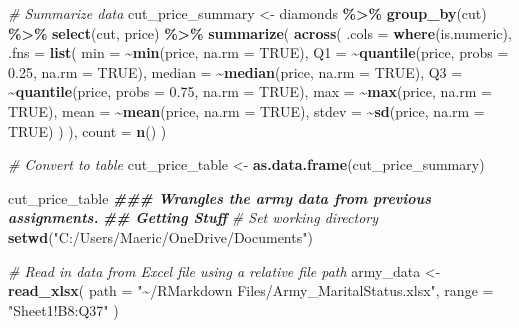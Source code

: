 \documentclass[
]{article}
\newenvironment{Shaded}{\begin{snugshade}}{\end{snugshade}}
\newcommand{\AttributeTok}[1]{\textcolor[rgb]{0.13,0.29,0.53}{#1}}
\newcommand{\CommentTok}[1]{\textcolor[rgb]{0.56,0.35,0.01}{\textit{#1}}}
\newcommand{\ConstantTok}[1]{\textcolor[rgb]{0.56,0.35,0.01}{#1}}
\newcommand{\DocumentationTok}[1]{\textcolor[rgb]{0.56,0.35,0.01}{\textbf{\textit{#1}}}}
\newcommand{\FloatTok}[1]{\textcolor[rgb]{0.00,0.00,0.81}{#1}}
\newcommand{\FunctionTok}[1]{\textcolor[rgb]{0.13,0.29,0.53}{\textbf{#1}}}
\newcommand{\NormalTok}[1]{#1}
\newcommand{\OtherTok}[1]{\textcolor[rgb]{0.56,0.35,0.01}{#1}}
\newcommand{\SpecialCharTok}[1]{\textcolor[rgb]{0.81,0.36,0.00}{\textbf{#1}}}
\newcommand{\StringTok}[1]{\textcolor[rgb]{0.31,0.60,0.02}{#1}}
\begin{document}
\begin{Shaded}
\begin{Highlighting}[]
\CommentTok{\# Summarize data}
\NormalTok{cut\_price\_summary }\OtherTok{\textless{}{-}}\NormalTok{ diamonds }\SpecialCharTok{\%\textgreater{}\%}
  \FunctionTok{group\_by}\NormalTok{(cut) }\SpecialCharTok{\%\textgreater{}\%}
  \FunctionTok{select}\NormalTok{(cut, price) }\SpecialCharTok{\%\textgreater{}\%}
  \FunctionTok{summarize}\NormalTok{(}
    \FunctionTok{across}\NormalTok{(}
      \AttributeTok{.cols =} \FunctionTok{where}\NormalTok{(is.numeric),}
      \AttributeTok{.fns =} \FunctionTok{list}\NormalTok{(}
        \AttributeTok{min =} \SpecialCharTok{\textasciitilde{}}\FunctionTok{min}\NormalTok{(price, }\AttributeTok{na.rm =} \ConstantTok{TRUE}\NormalTok{),}
        \AttributeTok{Q1 =} \SpecialCharTok{\textasciitilde{}}\FunctionTok{quantile}\NormalTok{(price, }\AttributeTok{probs =} \FloatTok{0.25}\NormalTok{, }\AttributeTok{na.rm =} \ConstantTok{TRUE}\NormalTok{),}
        \AttributeTok{median =} \SpecialCharTok{\textasciitilde{}}\FunctionTok{median}\NormalTok{(price, }\AttributeTok{na.rm =} \ConstantTok{TRUE}\NormalTok{),}
        \AttributeTok{Q3 =} \SpecialCharTok{\textasciitilde{}}\FunctionTok{quantile}\NormalTok{(price, }\AttributeTok{probs =} \FloatTok{0.75}\NormalTok{, }\AttributeTok{na.rm =} \ConstantTok{TRUE}\NormalTok{),}
        \AttributeTok{max =} \SpecialCharTok{\textasciitilde{}}\FunctionTok{max}\NormalTok{(price, }\AttributeTok{na.rm =} \ConstantTok{TRUE}\NormalTok{),}
        \AttributeTok{mean =} \SpecialCharTok{\textasciitilde{}}\FunctionTok{mean}\NormalTok{(price, }\AttributeTok{na.rm =} \ConstantTok{TRUE}\NormalTok{),}
        \AttributeTok{stdev =} \SpecialCharTok{\textasciitilde{}}\FunctionTok{sd}\NormalTok{(price, }\AttributeTok{na.rm =} \ConstantTok{TRUE}\NormalTok{)}
\NormalTok{      )}
\NormalTok{    ),}
    \AttributeTok{count =} \FunctionTok{n}\NormalTok{()}
\NormalTok{  )}

\CommentTok{\# Convert to table}
\NormalTok{cut\_price\_table }\OtherTok{\textless{}{-}} \FunctionTok{as.data.frame}\NormalTok{(cut\_price\_summary)}

\NormalTok{cut\_price\_table}
\DocumentationTok{\#\#\# Wrangles the army data from previous assignments.}
\DocumentationTok{\#\# Getting Stuff}
\CommentTok{\# Set working directory}
\FunctionTok{setwd}\NormalTok{(}\StringTok{"C:/Users/Maeric/OneDrive/Documents"}\NormalTok{)}

\CommentTok{\# Read in data from Excel file using a relative file path}
\NormalTok{army\_data }\OtherTok{\textless{}{-}} \FunctionTok{read\_xlsx}\NormalTok{(}
  \AttributeTok{path =} \StringTok{"\textasciitilde{}/RMarkdown Files/Army\_MaritalStatus.xlsx"}\NormalTok{,}
  \AttributeTok{range =} \StringTok{"Sheet1!B8:Q37"}
\NormalTok{)}


\end{Highlighting}
\end{Shaded}
\end{document}
